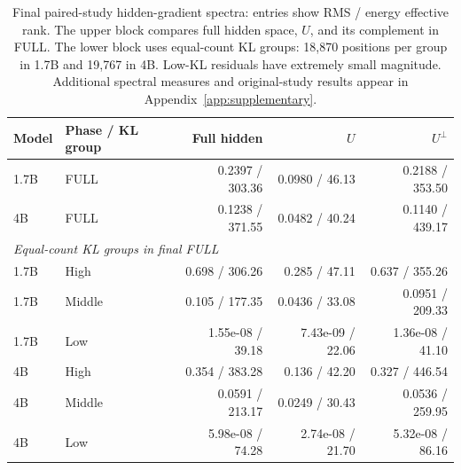 \begin{table}[!t]
\centering
\caption{Final paired-study hidden-gradient spectra: entries show RMS / energy effective rank. The upper block compares full hidden space, $U$, and its complement in FULL. The lower block uses equal-count KL groups: 18,870 positions per group in 1.7B and 19,767 in 4B. Low-KL residuals have extremely small magnitude. Additional spectral measures and original-study results appear in Appendix~\ref{app:supplementary}.}
\label{tab:spectrum_summary}
\small
\setlength{\tabcolsep}{3pt}
\begin{tabular}{llrrr}
\toprule
Model & Phase / KL group & Full hidden & $U$ & $U^\perp$ \\
\midrule
1.7B & FULL & 0.2397 / 303.36 & 0.0980 / 46.13 & 0.2188 / 353.50 \\
4B & FULL & 0.1238 / 371.55 & 0.0482 / 40.24 & 0.1140 / 439.17 \\
\midrule
\multicolumn{5}{l}{\textit{Equal-count KL groups in final FULL}} \\
1.7B & High & 0.698 / 306.26 & 0.285 / 47.11 & 0.637 / 355.26 \\
1.7B & Middle & 0.105 / 177.35 & 0.0436 / 33.08 & 0.0951 / 209.33 \\
1.7B & Low & 1.55e-08 / 39.18 & 7.43e-09 / 22.06 & 1.36e-08 / 41.10 \\
4B & High & 0.354 / 383.28 & 0.136 / 42.20 & 0.327 / 446.54 \\
4B & Middle & 0.0591 / 213.17 & 0.0249 / 30.43 & 0.0536 / 259.95 \\
4B & Low & 5.98e-08 / 74.28 & 2.74e-08 / 21.70 & 5.32e-08 / 86.16 \\
\bottomrule
\end{tabular}
\end{table}
